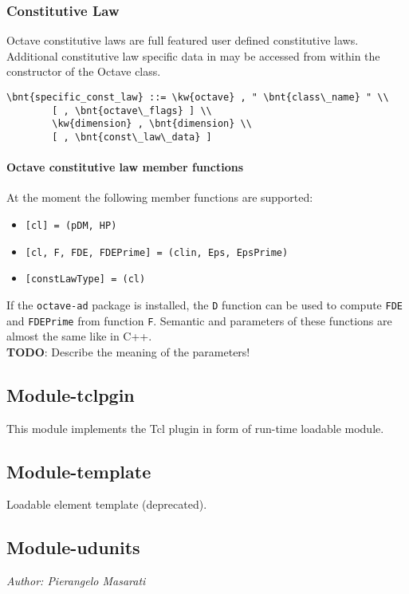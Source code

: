 \subsubsection{Constitutive Law}
Octave constitutive laws are full featured user defined constitutive laws.
Additional constitutive law specific data in  may be accessed from within the constructor of the Octave class.
\begin{Verbatim}[commandchars=\\\{\}]
    \bnt{specific_const_law} ::= \kw{octave} , " \bnt{class\_name} " \\
        [ , \bnt{octave\_flags} ] \\
        \kw{dimension} , \bnt{dimension} \\
        [ , \bnt{const\_law\_data} ]
\end{Verbatim}

\paragraph{Octave constitutive law member functions}
At the moment the following member functions are supported:
\begin{itemize}
\item \verb![cl] = !\verb!(pDM, HP) !
\item \verb![cl, F, FDE, FDEPrime] = !\verb!(clin, Eps, EpsPrime) !
\item \verb![constLawType] = !\verb!(cl) !
\end{itemize}
If the \texttt{octave-ad} package is installed, the \texttt{D} function
can be used to compute \texttt{FDE} and \texttt{FDEPrime}
from function \texttt{F}.
Semantic and parameters of these functions are almost the same like in C++. \\
\textbf{TODO}: Describe the meaning of the parameters!

\subsection{Module-tclpgin}
This module implements the Tcl plugin in form of run-time loadable module.
 
\subsection{Module-template}
Loadable element template (deprecated).

\subsection{Module-udunits}
\emph{Author: Pierangelo Masarati}

